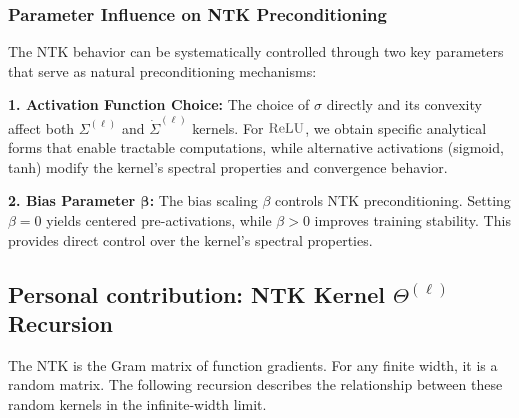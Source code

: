 \documentclass[a4paper]{article}
\newcommand{\ReLU}{\textcolor{relucolor}{\text{ReLU}}}
\DeclareRobustCommand{\ReLU}{\mathrel{\text{%
    \begin{tikzpicture}[baseline=(current bounding box.south)]
        \draw[thick] (0,0) -- (0.25,0) -- (0.4,0.25);
    \end{tikzpicture}}}\!\!}
\theoremstyle{plain}
\theoremstyle{definition}
\theoremstyle{remark}
\begin{document}
\subsubsection{Parameter Influence on NTK Preconditioning}

\begin{tcolorbox}[colback=green!5,colframe=green!80!black,title={\textbf{Remark: Activation and Bias Influence on NTK}},enhanced,drop shadow,boxrule=2pt]
The NTK behavior can be systematically controlled through two key parameters that serve as natural preconditioning mechanisms:

\textbf{1. Activation Function Choice:} The choice of $\sigma$ directly and its convexity affect both $\Sigma^{(\ell)}$ and $\dot{\Sigma}^{(\ell)}$ kernels. For $\ReLU$, we obtain specific analytical forms that enable tractable computations, while alternative activations (sigmoid, tanh) modify the kernel's spectral properties and convergence behavior.

\textbf{2. Bias Parameter $\boldsymbol{\beta}$:} The bias scaling $\beta$ controls NTK preconditioning. Setting $\beta = 0$ yields centered pre-activations, while $\beta > 0$ improves training stability. This provides direct control over the kernel's spectral properties.
\end{tcolorbox}















\subsection{Personal contribution: NTK Kernel \(\Theta^{(\ell)}\) Recursion}
The NTK is the Gram matrix of function gradients. For any finite width, it is a random matrix. The following recursion describes the relationship between these random kernels in the infinite-width limit.
\end{document}
